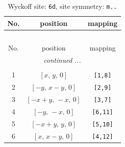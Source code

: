 \documentclass[fleqn,8pt]{jsarticle}
\begin{document}
\renewcommand{\arraystretch}{1.2}
\begin{longtable}{ccc}
\caption{Wyckoff site: {\tt 6d}, site symmetry: {\tt m..}}
 \\
 \hline \hline
No. & position & mapping \\ \hline \endfirsthead

\multicolumn{2}{l}{\tablename\ \thetable{}} \\
 \hline \hline
No. & position & mapping \\ \hline \endhead

 \hline \hline
\multicolumn{2}{r}{\footnotesize\it continued ...} \\ \endfoot

 \hline \hline
\multicolumn{2}{r}{} \\ \endlastfoot

1 & $\left[ x,\, y,\, 0 \right]$ & {\tt [1,8]} \\ \hline
2 & $\left[ - y,\, x - y,\, 0 \right]$ & {\tt [2,9]} \\ \hline
3 & $\left[ - x + y,\, - x,\, 0 \right]$ & {\tt [3,7]} \\ \hline
4 & $\left[ - y,\, - x,\, 0 \right]$ & {\tt [6,11]} \\ \hline
5 & $\left[ - x + y,\, y,\, 0 \right]$ & {\tt [5,10]} \\ \hline
6 & $\left[ x,\, x - y,\, 0 \right]$ & {\tt [4,12]} \\
\end{longtable}
\renewcommand{\arraystretch}{1.2}
\end{document}
